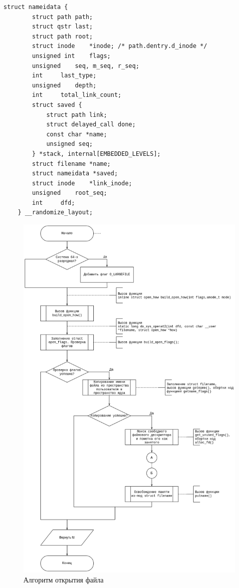 \documentclass[12pt,a4paper]{scrreprt}
\begin{document}
\begin{lstlisting}[caption={Структура nameidata}]
	struct nameidata {
		struct path	path;
		struct qstr	last;
		struct path	root;
		struct inode	*inode; /* path.dentry.d_inode */
		unsigned int	flags;
		unsigned	seq, m_seq, r_seq;
		int		last_type;
		unsigned	depth;
		int		total_link_count;
		struct saved {
			struct path link;
			struct delayed_call done;
			const char *name;
			unsigned seq;
		} *stack, internal[EMBEDDED_LEVELS];
		struct filename *name;
		struct nameidata *saved;
		struct inode	*link_inode;
		unsigned	root_seq;
		int		dfd;
	} __randomize_layout;
\end{lstlisting}

\begin{figure}[H]
	\centering
	\includegraphics[scale=0.45]{pics/1_1.png}
	\caption{Алгоритм открытия файла}
\end{figure}
\end{document}
